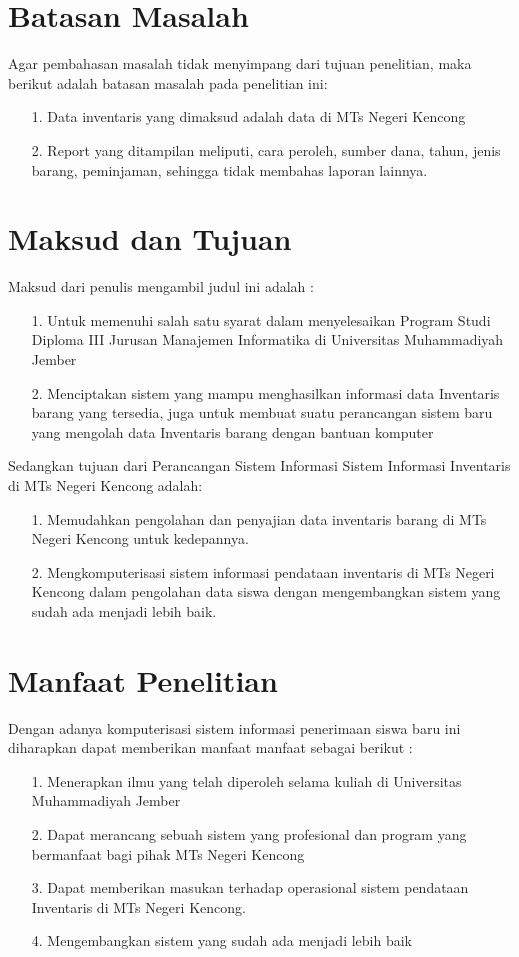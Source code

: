 \documentclass{jtetiproposalskripsi}
\begin{document}
\section{Batasan Masalah}
Agar pembahasan masalah tidak menyimpang dari tujuan penelitian, maka berikut adalah batasan masalah pada  penelitian ini:
\begin{itemize}
\item[1.]Data inventaris yang dimaksud adalah data di MTs Negeri Kencong
\item[2.]Report yang ditampilan meliputi, cara peroleh, sumber dana, tahun, jenis barang, peminjaman, sehingga tidak membahas laporan lainnya.

\end{itemize}

\section{Maksud dan Tujuan}
Maksud dari penulis mengambil judul ini adalah :



\begin{itemize}
\item[1.]Untuk memenuhi salah satu syarat dalam menyelesaikan Program Studi Diploma III Jurusan Manajemen Informatika di Universitas Muhammadiyah Jember
\item[2.]Menciptakan sistem yang mampu menghasilkan informasi data Inventaris barang yang tersedia, juga untuk membuat suatu perancangan sistem baru yang mengolah data Inventaris barang dengan bantuan komputer  
\end{itemize}
Sedangkan tujuan dari Perancangan Sistem Informasi Sistem Informasi Inventaris di MTs Negeri Kencong adalah: 
\begin{itemize}
\item[1.]Memudahkan pengolahan dan penyajian data inventaris barang di MTs Negeri Kencong untuk kedepannya.
\item[2.]Mengkomputerisasi sistem informasi pendataan inventaris di MTs Negeri Kencong dalam pengolahan data siswa dengan mengembangkan sistem yang sudah ada menjadi lebih baik.
\end{itemize}


\section{Manfaat Penelitian}
Dengan adanya komputerisasi sistem informasi penerimaan siswa baru ini diharapkan dapat memberikan manfaat manfaat sebagai berikut :
\begin{itemize}
\item[1.]Menerapkan ilmu yang telah diperoleh selama kuliah di Universitas Muhammadiyah Jember 
\item[2.]Dapat merancang sebuah sistem yang profesional dan program yang bermanfaat bagi pihak MTs Negeri Kencong 
\item[3.]Dapat memberikan masukan terhadap operasional sistem pendataan Inventaris di  MTs Negeri Kencong.
\item[4.]Mengembangkan sistem yang sudah ada menjadi lebih baik
\end{itemize}
\end{document}
